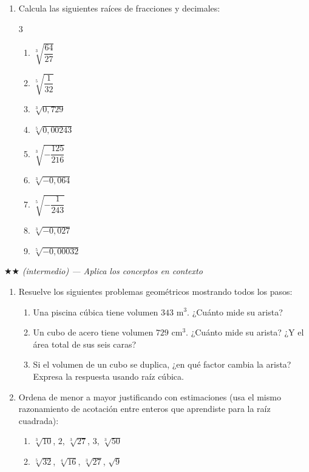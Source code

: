 \documentclass[11pt, letterpaper]{article}
\begin{document}
\begin{enumerate}[label=\textbf{\arabic*.}, leftmargin=*]
  \item Calcula las siguientes raíces de fracciones y decimales:
  \begin{multicols}{3}
  \begin{enumerate}[label=\alph*)]
    \item $\sqrt[3]{\dfrac{64}{27}}$
    \item $\sqrt[5]{\dfrac{1}{32}}$
    \item $\sqrt[3]{0{,}729}$
    \item $\sqrt[5]{0{,}00243}$
    \item $\sqrt[3]{-\dfrac{125}{216}}$
    \item $\sqrt[3]{-0{,}064}$
    \item $\sqrt[5]{-\dfrac{1}{243}}$
    \item $\sqrt[3]{-0{,}027}$
    \item $\sqrt[5]{-0{,}00032}$
  \end{enumerate}
  \end{multicols}
\end{enumerate}

$\bigstar\bigstar$ \textit{(intermedio) — Aplica los conceptos en contexto}

\begin{enumerate}[label=\textbf{\arabic*.}, leftmargin=*, resume]
  \item Resuelve los siguientes problemas geométricos mostrando todos los pasos:
  \begin{enumerate}[label=\alph*)]
    \item Una piscina cúbica tiene volumen $343$ m$^3$. ¿Cuánto mide su arista?
    \item Un cubo de acero tiene volumen $729$ cm$^3$. ¿Cuánto mide su arista? ¿Y el área total de sus seis caras?
    \item Si el volumen de un cubo se duplica, ¿en qué factor cambia la arista? Expresa la respuesta usando raíz cúbica.
  \end{enumerate}

  \item Ordena de menor a mayor justificando con estimaciones (usa el mismo razonamiento de acotación entre enteros que aprendiste para la raíz cuadrada):
  \begin{enumerate}[label=\alph*)]
    \item $\sqrt[3]{10}$, $2$, $\sqrt[3]{27}$, $3$, $\sqrt[3]{50}$
    \item $\sqrt[5]{32}$, $\sqrt[4]{16}$, $\sqrt[3]{27}$, $\sqrt{9}$
  \end{enumerate}
\end{enumerate}
\end{document}
